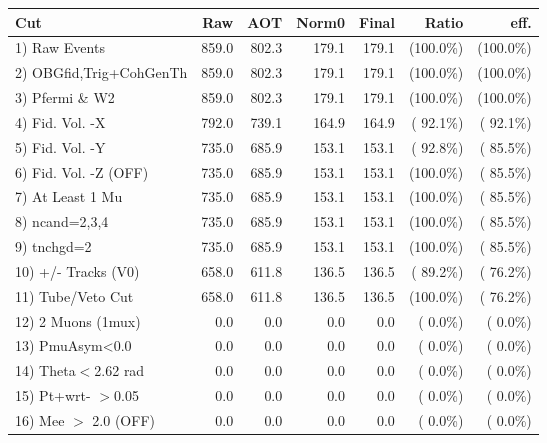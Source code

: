  \begin{table}[h!]\centering
 \begin{tabular}{||l||r|r|r|r|r|r||}
 \hline
 \hline
 Cut & Raw & AOT & Norm0 & Final & Ratio & eff.       \\
 \hline
  1) Raw Events           &        859.0 &        802.3 &        179.1 &        179.1 & (100.0\%) & (100.0\%) \\
  2) OBGfid,Trig+CohGenTh &        859.0 &        802.3 &        179.1 &        179.1 & (100.0\%) & (100.0\%) \\
  3) Pfermi \& W2         &        859.0 &        802.3 &        179.1 &        179.1 & (100.0\%) & (100.0\%) \\
  4) Fid. Vol. -X         &        792.0 &        739.1 &        164.9 &        164.9 & ( 92.1\%) & ( 92.1\%) \\
  5) Fid. Vol. -Y         &        735.0 &        685.9 &        153.1 &        153.1 & ( 92.8\%) & ( 85.5\%) \\
  6) Fid. Vol. -Z (OFF)   &        735.0 &        685.9 &        153.1 &        153.1 & (100.0\%) & ( 85.5\%) \\
  7) At Least 1 Mu        &        735.0 &        685.9 &        153.1 &        153.1 & (100.0\%) & ( 85.5\%) \\
  8) ncand=2,3,4          &        735.0 &        685.9 &        153.1 &        153.1 & (100.0\%) & ( 85.5\%) \\
  9) tnchgd=2             &        735.0 &        685.9 &        153.1 &        153.1 & (100.0\%) & ( 85.5\%) \\
 10) +/- Tracks (V0)      &        658.0 &        611.8 &        136.5 &        136.5 & ( 89.2\%) & ( 76.2\%) \\
 11) Tube/Veto Cut        &        658.0 &        611.8 &        136.5 &        136.5 & (100.0\%) & ( 76.2\%) \\
 12) 2 Muons (1mux)       &          0.0 &          0.0 &          0.0 &          0.0 & (  0.0\%) & (  0.0\%) \\
 13) PmuAsym<0.0          &          0.0 &          0.0 &          0.0 &          0.0 & (  0.0\%) & (  0.0\%) \\
 14) Theta$<$2.62 rad     &          0.0 &          0.0 &          0.0 &          0.0 & (  0.0\%) & (  0.0\%) \\
 15) Pt+wrt- $>$0.05      &          0.0 &          0.0 &          0.0 &          0.0 & (  0.0\%) & (  0.0\%) \\
 16) Mee $>$ 2.0  (OFF)   &          0.0 &          0.0 &          0.0 &          0.0 & (  0.0\%) & (  0.0\%) \\

\end{tabular}
\end{table}
